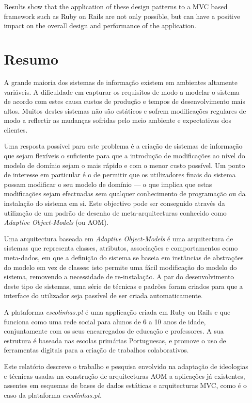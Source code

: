 Results show that the application of these design patterns to a MVC based framework such as Ruby on Rails are not only possible, but can have a positive impact on the overall design and performance of the application.

\chapter*{Resumo}

A grande maioria dos sistemas de informação existem em ambientes altamente variáveis. A dificuldade em capturar os requisitos de modo a modelar o sistema de acordo com estes causa custos de produção e tempos de desenvolvimento mais altos. Muitos destes sistemas não são estáticos e sofrem modificações regulares de modo a reflectir as mudanças sofridas pelo meio ambiente e expectativas dos clientes.

Uma resposta possível para este problema é a criação de sistemas de informação que sejam flexíveis o suficiente para que a introdução de modificações ao nível do modelo de domínio sejam o mais rápido e com o menor custo possível. Um ponto de interesse em particular é o de permitir que os utilizadores finais do sistema possam modificar o seu modelo de domínio --- o que implica que estas modificações sejam efectuadas sem qualquer conhecimento de programação ou da instalação do sistema em si. Este objectivo pode ser conseguido através da utilização de um padrão de desenho de meta-arquitecturas conhecido como \textit{Adaptive Object-Models} (ou AOM).

Uma arquitectura baseada em \textit{Adaptive Object-Models} é uma arquitectura de sistemas que representa classes, atributos, associações e comportamentos como meta-dados, em que a definição do sistema se baseia em instâncias de abstrações do modelo em vez de classes: isto permite uma fácil modificação do modelo do sistema, removendo a necessidade de re-instalação. A par do desenvolvimento deste tipo de sistemas, uma série de técnicas e padrões foram criados para que a interface do utilizador seja passível de ser criada automaticamente.

A plataforma \emph{escolinhas.pt} é uma applicação criada em Ruby on Rails e que funciona como uma rede social para alunos de 6 a 10 anos de idade, conjuntamente com os seus encarregados de educação e professores. A sua estrutura é baseada nas escolas primárias Portuguesas, e promove o uso de ferramentas digitais para a criação de trabalhos colaborativos.

Este relatório descreve o trabalho e pesquisa envolvido na adaptação de ideologias e técnicas usadas na construção de arquitecturas AOM a aplicações já existentes, assentes em esquemas de bases de dados estáticas e arquitecturas MVC, como é o caso da plataforma \emph{escolinhas.pt}.

